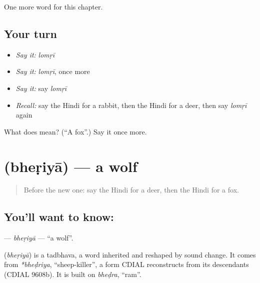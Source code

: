 \begin{grammarlens}[title={What you've built}]
One more word for this chapter.
\end{grammarlens}

\subsection*{Your turn}
\begin{itemize}
\raggedright
  \item \emph{Say it:} \emph{lomṛī}
  \item \emph{Say it:} \emph{lomṛī}, once more
  \item \emph{Say it:} say \emph{lomṛī}
  \item \emph{Recall:} say the Hindi for a rabbit, then the Hindi for a deer, then say \emph{lomṛī} again
\end{itemize}

\begin{tcolorbox}[breakable,colback=teal!4,colframe=teal!35!black,title={Before you move on}]
What does  mean? (\textquotedblleft{}A fox\textquotedblright{}.) Say it once more.
\end{tcolorbox}
\section[\texorpdfstring{\hi{भेड़िया} (bheṛiyā)}{भेड़िया (bheṛiyā)}]{ (bheṛiyā) — a wolf}

\label{lesson:HI-C147-bheriya}



\begin{quote}
Before the new one: say the Hindi for a deer, then the Hindi for a fox.
\end{quote}

\subsection*{You'll want to know: }
\textbf{} — \emph{bheṛiyā} — \textquotedblleft{}a wolf\textquotedblright{}.

\begin{cousinweb}
\textbf{} (\emph{bheṛiyā}) is a tadbhava, a word inherited and reshaped by sound change. It comes from \emph{*bheḍriya}, \textquotedblleft{}sheep-killer\textquotedblright{}, a form CDIAL reconstructs from its descendants (CDIAL 9608b). It is built on \emph{bheḍra}, \textquotedblleft{}ram\textquotedblright{}.
\end{cousinweb}

